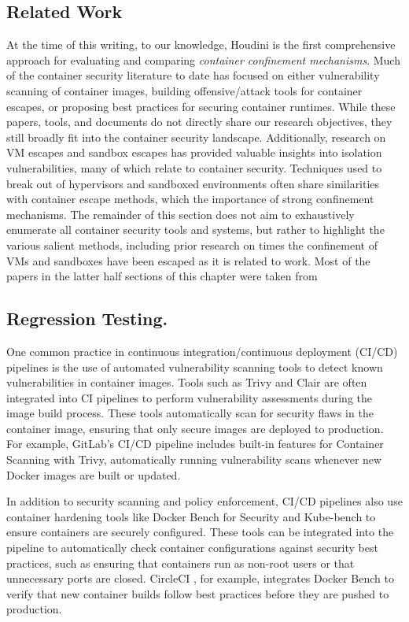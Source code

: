 \documentclass[12pt]{report}
\begin{document}
\begin{doublespace}
\chapter{Related Work}

At the time of this writing, to our knowledge, Houdini is the first comprehensive approach for evaluating and comparing \textit{container confinement mechanisms}. Much of the container security literature to date has focused on either vulnerability scanning of container images, building offensive/attack tools for container escapes, or proposing best practices for securing container runtimes. While these papers, tools, and documents do not directly share our research objectives, they still broadly fit into the container security landscape. Additionally, research on VM escapes and sandbox escapes has provided valuable insights into isolation vulnerabilities, many of which relate to container security. Techniques used to break out of hypervisors and sandboxed environments often share similarities with container escape methods, which the importance of strong confinement mechanisms. The remainder of this section does not aim to exhaustively enumerate all container security tools and systems, but rather to highlight the various salient methods, including prior research on times the confinement of VMs and sandboxes have been escaped as it is related to work. Most of the papers in the latter half sections of this chapter were taken from \cite{haq2024sok}

\section{Regression Testing.} 

One common practice in continuous integration/continuous deployment (CI/CD) pipelines is the use of automated vulnerability scanning tools to detect known vulnerabilities in container images. Tools such as Trivy \cite{trivy} and Clair \cite{clair} are often integrated into CI pipelines to perform vulnerability assessments during the image build process. These tools automatically scan for security flaws in the container image, ensuring that only secure images are deployed to production. For example, GitLab’s CI/CD pipeline includes built-in features for Container Scanning with Trivy, automatically running vulnerability scans whenever new Docker images are built or updated.

In addition to security scanning and policy enforcement, CI/CD pipelines also use container hardening tools like Docker Bench for Security \cite{docker_bench} and Kube-bench \cite{kube_bench} to ensure containers are securely configured. These tools can be integrated into the pipeline to automatically check container configurations against security best practices, such as ensuring that containers run as non-root users or that unnecessary ports are closed. CircleCI \cite{circleci}, for example, integrates Docker Bench to verify that new container builds follow best practices before they are pushed to production.\\


\end{doublespace}
\end{document}

